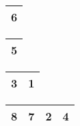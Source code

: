 \begin{frame}
\begin{table}
\begin{tabular}{| c |}
\hline
\cellcolor{blue!25}6 \\ 
\hline
\end{tabular}
\quad
\begin{tabular}{| c |}
\hline
\cellcolor{blue!25}5 \\ 
\hline
\end{tabular}
\quad
\begin{tabular}{| c | c |}
\hline
3 & 1 \\ 
\hline
\end{tabular}
\quad
\begin{tabular}{| c | c | c | c |}
\hline
8 & 7 & 2 & 4 \\ 
\hline
\end{tabular}
\end{table}
\end{frame}



